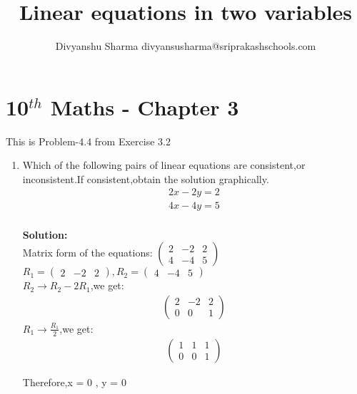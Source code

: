 \documentclass[12pt]{article}
\title{Linear equations in two variables}
\author{Divyanshu Sharma {divyansusharma@sriprakashschools.com}}
\newcommand{\myvec}[1]{\ensuremath{\begin{pmatrix}#1\end{pmatrix}}}
\newcommand{\solution}{\noindent \textbf{Solution: }}
\begin{document}
\maketitle
\section*{10$^{th}$ Maths - Chapter 3}
This is Problem-4.4 from Exercise 3.2
\begin{enumerate}
\item Which of the following pairs of linear equations are consistent,or inconsistent.If consistent,obtain the solution graphically.\\
\begin{align}
2x-2y=2\\
4x-4y=5\\
\end{align}

\solution \\
Matrix form of the equations:
$\myvec{2 & -2 & 2\\4 & -4 & 5}$\\
$R_1=\myvec{2 & -2 & 2},R_2=\myvec{4 & -4 & 5}$\\
$R_2\rightarrow R_2 - 2R_1$,we get:
\begin{align}
\myvec{2 & -2 & 2\\0 & 0 & 1}
\end{align}
$R_1\rightarrow \frac{R_1}{2}$,we get:
\begin{align}
\myvec{1 & 1 & 1\\0 & 0 & 1}
\end{align}

Therefore,x = 0 , y = 0
\end{enumerate}
\end{document}
